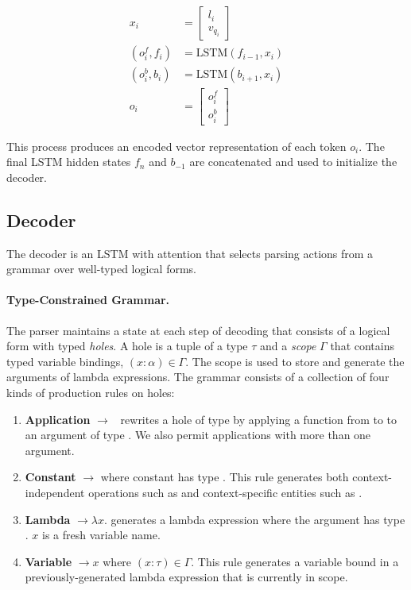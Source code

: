 \begin{align}
x_i &= \begin{bmatrix} l_{i} \\ v_{q_i} \end{bmatrix} \\
(o^f_i, f_i) &= \text{LSTM}(f_{i-1}, x_i) \\
(o^b_i, b_i) &= \text{LSTM}(b_{i+1}, x_i) \\
o_i &= \begin{bmatrix} o^f_i \\  o^b_i \end{bmatrix}
\end{align}

This process produces an encoded vector representation of each token $o_i$. The 
final LSTM hidden states $f_n$ and $b_{-1}$ are concatenated  and used to 
initialize the decoder.

\subsection{Decoder}
\label{sec:nnsp_decoder}

The decoder is an LSTM with attention that selects parsing actions from a 
grammar over well-typed logical forms.

\paragraph{Type-Constrained Grammar.} The parser maintains a state at each step 
of decoding that consists of a logical form with typed \emph{holes}.
A hole is a tuple \hole{\tau}{\Gamma} of a type $\tau$ and a \emph{scope} 
$\Gamma$ that contains typed variable bindings, $(x:\alpha) \in \Gamma$.
The scope is used to store and generate the arguments of lambda expressions. 
The grammar consists of a collection of four kinds of production rules on holes:

\begin{enumerate}
    \item \textbf{Application} 
\hole{\tau}{\Gamma}$\rightarrow$\pred{(}\hole{\func{\beta}{\tau}}{\Gamma}~\hole{
\beta}{\Gamma}\pred{)} rewrites a hole of type \type{\tau} by applying a 
function from \type{\beta} to \type{\tau} to an argument of type \type{\beta}. 
We also permit applications with more than one argument.
    \item \textbf{Constant} \hole{\tau}{\Gamma}$\rightarrow$ where 
constant  has type \type{\tau}. This rule generates both 
context-independent operations such as  and context-specific 
entities such as .
    \item \textbf{Lambda} \hole{\func{\alpha}{\tau}}{\Gamma}$\rightarrow 
\lambda x.$  generates a lambda 
expression where the argument has type \type{\alpha}. $x$ is a fresh variable 
name.
    \item \textbf{Variable} \hole{\tau}{\Gamma}$\rightarrow x$ where $(x : 
\tau) \in \Gamma$. This rule generates a variable bound in a 
previously-generated lambda expression that is currently in scope.
\end{enumerate}


